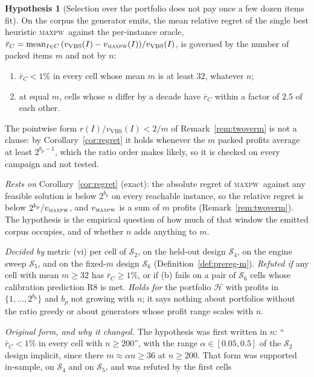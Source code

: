 \documentclass[a4paper,11pt]{article}
\newcommand{\bp}{b_{p}}
\newcommand{\heur}{\mathcal{H}}
\newcommand{\MAXPW}{\textsc{maxpw}}
\theoremstyle{plain}
\theoremstyle{definition}
\newtheorem{hypothesis}{Hypothesis}
\theoremstyle{remark}
\begin{document}
\begin{hypothesis}[Selection over the portfolio does not pay once a few dozen items fit]\label{h:selection}
On the corpus the generator emits, the mean relative regret of the single best heuristic
\MAXPW\ against the per-instance oracle,
$\bar r_C=\operatorname{mean}_{I\in C}\,(v_{\mathrm{VBS}}(I)-v_{\MAXPW}(I))/v_{\mathrm{VBS}}(I)$,
is governed by the number of packed items $m$ and not by $n$:
\begin{enumerate}[label=(\alph*),leftmargin=1.8em,itemsep=1pt]
\item $\bar r_C<1\%$ in every cell whose mean $m$ is at least $32$, whatever $n$;
\item at equal $m$, cells whose $n$ differ by a decade have $\bar r_C$ within a factor of
$2.5$ of each other.
\end{enumerate}
The pointwise form $r(I)/v_{\mathrm{VBS}}(I)<2/m$ of Remark~\ref{rem:twoverm} is not a
clause: by Corollary~\ref{cor:regret} it holds whenever the $m$ packed profits average at
least $2^{\bp-1}$, which the ratio order makes likely, so it is checked on every campaign
and not tested.
\par\emph{Rests on} Corollary~\ref{cor:regret} (exact): the absolute regret of \MAXPW\ against
any feasible solution is below $2^{\bp}$ on every reachable instance, so the relative regret
is below $2^{\bp}/v_{\MAXPW}$, and $v_{\MAXPW}$ is a sum of $m$ profits
(Remark~\ref{rem:twoverm}). The hypothesis is the empirical question of how much of that
window the emitted corpus occupies, and of whether $n$ adds anything to $m$.
\par\emph{Decided by} metric (vi) per cell of $\mathcal S_2$, on the held-out design
$\mathcal S_4$, on the engine sweep $\mathcal S_5$, and on the fixed-$m$ design $\mathcal S_6$
(Definition~\ref{def:prereg-m}). \emph{Refuted if} any cell with mean $m\ge32$ has
$\bar r_C\ge1\%$, or if (b) fails on a pair of $\mathcal S_6$ cells whose calibration
prediction R8 is met.
\emph{Holds for} the portfolio $\heur$ with profits in $\{1,\dots,2^{\bp}\}$ and $\bp$ not
growing with $n$; it says nothing about portfolios without the ratio greedy or about
generators whose profit range scales with $n$.
\par\emph{Original form, and why it changed.} The hypothesis was first written in $n$:
``$\bar r_C<1\%$ in every cell with $n\ge200$'', with the range $\alpha\in[0.05,0.5]$ of the
$\mathcal S_2$ design implicit, since there $m\approx\alpha n\ge36$ at $n\ge200$. That form was
supported in-sample, on $\mathcal S_4$ and on $\mathcal S_5$, and was refuted by the first cells

\end{hypothesis}
\end{document}
